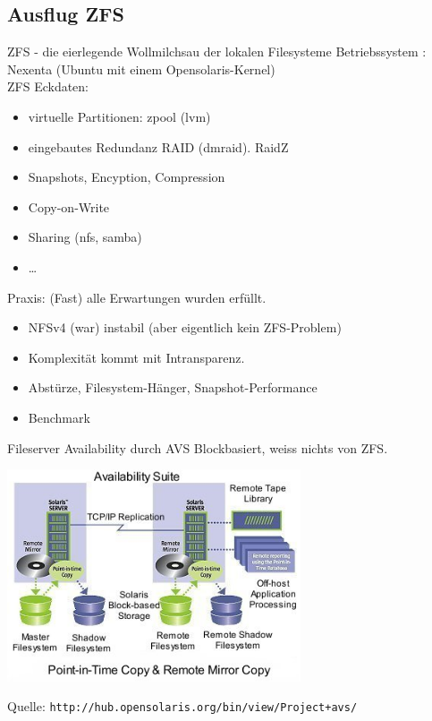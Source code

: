\documentclass[hyperref={xetex}]{beamer}
\begin{document}
\subsection{Ausflug ZFS}


\begin{frame}{ZFS - die eierlegende Wollmilchsau der lokalen Filesysteme}
    Betriebssystem : Nexenta (Ubuntu mit einem Opensolaris-Kernel)\\
    ZFS Eckdaten:
    \begin{itemize}
        \item virtuelle Partitionen: zpool (lvm)
        \item eingebautes Redundanz RAID (dmraid). RaidZ
        \item Snapshots, Encyption, Compression
        \item Copy-on-Write
        \item Sharing (nfs, samba)
        \item \ldots
    \end{itemize}
    \alert{Praxis:} (Fast) alle Erwartungen wurden erfüllt. \\
    \begin{itemize}
        \item NFSv4 (war) instabil (aber eigentlich kein ZFS-Problem)
        \item Komplexität kommt mit Intransparenz. 
        \item Abstürze, Filesystem-Hänger, Snapshot-Performance
        \item Benchmark
    \end{itemize}
\end{frame}

\begin{frame}{Fileserver Availability durch AVS}
    Blockbasiert, weiss nichts von ZFS.
	\begin{center}
	\includegraphics[width=0.65\textwidth]{images/availabilitysuitenew.jpg}
	\end{center}
	\small
	Quelle: \texttt{http://hub.opensolaris.org/bin/view/Project+avs/}
\end{frame}
\end{document}
